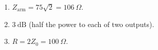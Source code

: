 \begin{enumerate}[leftmargin=1.6em,itemsep=2pt]
\item $Z_{\text{arm}} = 75\sqrt{2} = 106\ \Omega$.
\item $3\ \text{dB}$ (half the power to each of two outputs).
\item $R = 2Z_0 = 100\ \Omega$.
\end{enumerate}
